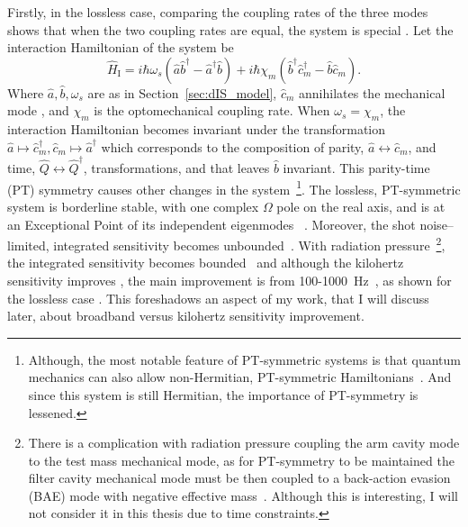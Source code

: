 Firstly, in the lossless case, comparing the coupling rates of the three modes shows that when the two coupling rates are equal, the system is special . Let the interaction Hamiltonian of the system be~\cite{} $$\hat{H}_\text{I}=i\hbar\omega_s(\hat{a}\hat{b}^\dag-\hat{a}^\dag\hat{b})+i\hbar\chi_m(\hat{b}^\dag\hat{c}_m^\dag-\hat{b}\hat{c}_m).$$ Where $\hat a, \hat b, \omega_s$ are as in Section~\ref{sec:dIS_model}, $\hat{c}_m$ annihilates the mechanical mode , and $\chi_m$ is the optomechanical coupling rate. When $\omega_s=\chi_m$, the interaction Hamiltonian becomes invariant under the transformation $\hat a\mapsto\hat{c}_m^\dag, \hat{c}_m\mapsto\hat a^\dag$ which corresponds to the composition of parity, $\hat a\leftrightarrow \hat{c}_m$, and time, $\hat Q\leftrightarrow \hat Q^\dag$, transformations, and that leaves $\hat b$ invariant. This parity-time (PT) symmetry causes other changes in the system~\footnote{Although, the most notable feature of PT-symmetric systems is that quantum mechanics can  also allow non-Hermitian, PT-symmetric Hamiltonians~\cite{}. And since this system is still Hermitian, the importance of PT-symmetry is lessened. }. 
The lossless, PT-symmetric system is borderline stable, with one complex $\Omega$ pole on the real axis, and is at an Exceptional Point of its independent eigenmodes~\cite{Li2020} . Moreover, the shot noise--limited, integrated sensitivity becomes unbounded~\cite{}. With radiation pressure~\footnote{There is a complication with radiation pressure coupling the arm cavity mode to the test mass mechanical mode, as for PT-symmetry to be maintained the filter cavity mechanical mode must be then coupled to a back-action evasion (BAE) mode with negative effective mass~\cite{}. Although this is interesting, I will not consider it in this thesis due to time constraints.}, the integrated sensitivity becomes bounded~\cite{} and although the kilohertz sensitivity improves , the main improvement is from 100-1000~Hz~\cite{}, as shown for the lossless case . This foreshadows an aspect of my work, that I will discuss later, about broadband versus kilohertz sensitivity improvement. 


